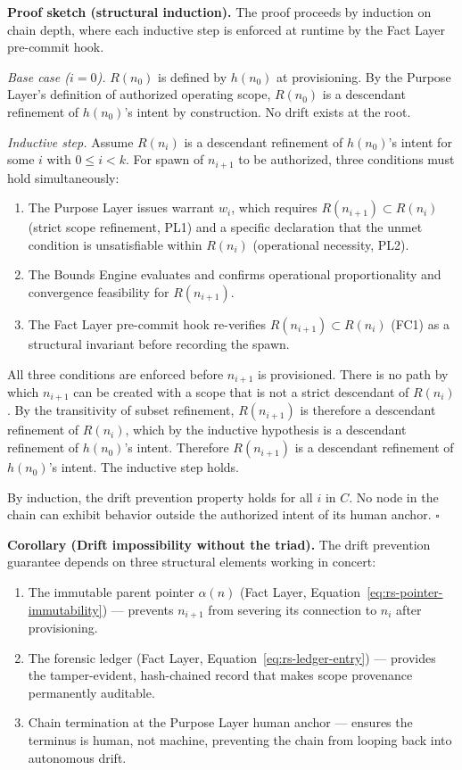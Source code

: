 \medskip
\noindent\textbf{Proof sketch (structural induction).} The proof proceeds by induction on chain depth, where each inductive step is enforced at runtime by the Fact Layer pre-commit hook.

\medskip
\textit{Base case ($i=0$).} $R(n_0)$ is defined by $h(n_0)$ at provisioning. By the Purpose Layer's definition of authorized operating scope, $R(n_0)$ is a descendant refinement of $h(n_0)$'s intent by construction. No drift exists at the root.

\medskip
\textit{Inductive step.} Assume $R(n_i)$ is a descendant refinement of $h(n_0)$'s intent for some $i$ with $0 \leq i < k$. For spawn of $n_{i+1}$ to be authorized, three conditions must hold simultaneously:

\begin{enumerate}
    \item[(i)] The Purpose Layer issues warrant $w_i$, which requires $R(n_{i+1}) \subset R(n_i)$ (strict scope refinement, PL1) and a specific declaration that the unmet condition is unsatisfiable within $R(n_i)$ (operational necessity, PL2).
    \item[(ii)] The Bounds Engine evaluates and confirms operational proportionality and convergence feasibility for $R(n_{i+1})$.
    \item[(iii)] The Fact Layer pre-commit hook re-verifies $R(n_{i+1}) \subset R(n_i)$ (FC1) as a structural invariant before recording the spawn.
\end{enumerate}

All three conditions are enforced before $n_{i+1}$ is provisioned. There is no path by which $n_{i+1}$ can be created with a scope that is not a strict descendant of $R(n_i)$. By the transitivity of subset refinement, $R(n_{i+1})$ is therefore a descendant refinement of $R(n_i)$, which by the inductive hypothesis is a descendant refinement of $h(n_0)$'s intent. Therefore $R(n_{i+1})$ is a descendant refinement of $h(n_0)$'s intent. The inductive step holds.

By induction, the drift prevention property holds for all $i$ in $C$. No node in the chain can exhibit behavior outside the authorized intent of its human anchor. $\square$

\medskip
\noindent\textbf{Corollary (Drift impossibility without the triad).} The drift prevention guarantee depends on three structural elements working in concert:

\begin{enumerate}
    \item[(A)] The immutable parent pointer $\alpha(n)$ (Fact Layer, Equation~\ref{eq:rs-pointer-immutability}) — prevents $n_{i+1}$ from severing its connection to $n_i$ after provisioning.
    \item[(B)] The forensic ledger (Fact Layer, Equation~\ref{eq:rs-ledger-entry}) — provides the tamper-evident, hash-chained record that makes scope provenance permanently auditable.
    \item[(C)] Chain termination at the Purpose Layer human anchor — ensures the terminus is human, not machine, preventing the chain from looping back into autonomous drift.
\end{enumerate}

